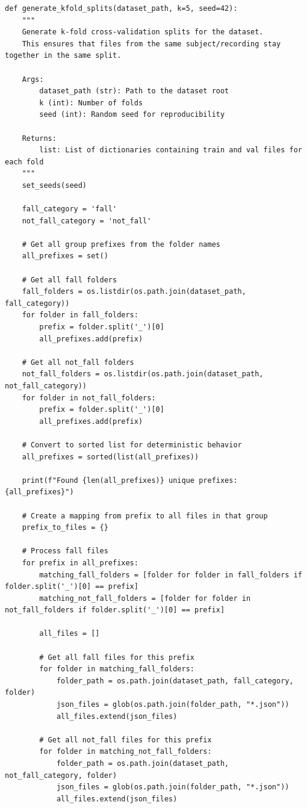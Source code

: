 \begin{lstlisting}[caption={Membuat pembagian K-Fold}, label={kode:generate k-fold}]
def generate_kfold_splits(dataset_path, k=5, seed=42):
    """
    Generate k-fold cross-validation splits for the dataset.
    This ensures that files from the same subject/recording stay together in the same split.
    
    Args:
        dataset_path (str): Path to the dataset root
        k (int): Number of folds
        seed (int): Random seed for reproducibility
        
    Returns:
        list: List of dictionaries containing train and val files for each fold
    """
    set_seeds(seed)
    
    fall_category = 'fall'
    not_fall_category = 'not_fall'
    
    # Get all group prefixes from the folder names
    all_prefixes = set()
    
    # Get all fall folders
    fall_folders = os.listdir(os.path.join(dataset_path, fall_category))
    for folder in fall_folders:
        prefix = folder.split('_')[0]
        all_prefixes.add(prefix)
    
    # Get all not_fall folders
    not_fall_folders = os.listdir(os.path.join(dataset_path, not_fall_category))
    for folder in not_fall_folders:
        prefix = folder.split('_')[0]
        all_prefixes.add(prefix)
    
    # Convert to sorted list for deterministic behavior
    all_prefixes = sorted(list(all_prefixes))
    
    print(f"Found {len(all_prefixes)} unique prefixes: {all_prefixes}")
    
    # Create a mapping from prefix to all files in that group
    prefix_to_files = {}
    
    # Process fall files
    for prefix in all_prefixes:
        matching_fall_folders = [folder for folder in fall_folders if folder.split('_')[0] == prefix]
        matching_not_fall_folders = [folder for folder in not_fall_folders if folder.split('_')[0] == prefix]
        
        all_files = []
        
        # Get all fall files for this prefix
        for folder in matching_fall_folders:
            folder_path = os.path.join(dataset_path, fall_category, folder)
            json_files = glob(os.path.join(folder_path, "*.json"))
            all_files.extend(json_files)
        
        # Get all not_fall files for this prefix
        for folder in matching_not_fall_folders:
            folder_path = os.path.join(dataset_path, not_fall_category, folder)
            json_files = glob(os.path.join(folder_path, "*.json"))
            all_files.extend(json_files)
        

\end{lstlisting}
